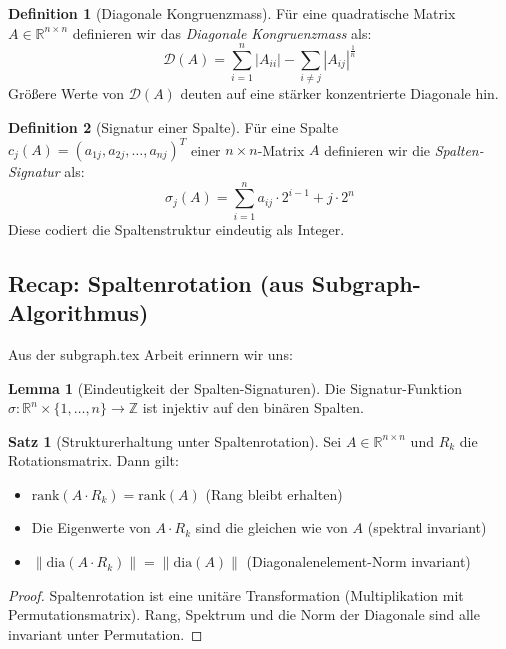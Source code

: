 \documentclass[a4paper,12pt]{article}
\theoremstyle{definition}
\newtheorem{definition}{Definition}
\newtheorem{satz}{Satz}
\newtheorem{lemma}{Lemma}
\begin{document}
\begin{definition}[Diagonale Kongruenzmass]
	Für eine quadratische Matrix $A \in \mathbb{R}^{n \times n}$ definieren wir das \emph{Diagonale Kongruenzmass} als:
	\[
	\mathcal{D}(A) = \sum_{i=1}^{n} |A_{ii}| - \sum_{i \neq j} |A_{ij}|^{\frac{1}{n}}
	\]
	Größere Werte von $\mathcal{D}(A)$ deuten auf eine stärker konzentrierte Diagonale hin.
\end{definition}

\begin{definition}[Signatur einer Spalte]
	Für eine Spalte $c_j(A) = (a_{1j}, a_{2j}, \ldots, a_{nj})^T$ einer $n \times n$-Matrix $A$ definieren wir die \emph{Spalten-Signatur} als:
	\[
	\sigma_j(A) = \sum_{i=1}^{n} a_{ij} \cdot 2^{i-1} + j \cdot 2^n
	\]
	Diese codiert die Spaltenstruktur eindeutig als Integer.
\end{definition}

\subsection{Recap: Spaltenrotation (aus Subgraph-Algorithmus)}

Aus der subgraph.tex Arbeit erinnern wir uns:

\begin{lemma}[Eindeutigkeit der Spalten-Signaturen]
	Die Signatur-Funktion $\sigma: \mathbb{R}^n \times \{1,\ldots,n\} \to \mathbb{Z}$ ist injektiv auf den binären Spalten.
\end{lemma}

\begin{satz}[Strukturerhaltung unter Spaltenrotation]
	Sei $A \in \mathbb{R}^{n \times n}$ und $R_k$ die Rotationsmatrix. Dann gilt:
	\begin{itemize}
		\item $\text{rank}(A \cdot R_k) = \text{rank}(A)$ (Rang bleibt erhalten)
		\item Die Eigenwerte von $A \cdot R_k$ sind die gleichen wie von $A$ (spektral invariant)
		\item $\|\text{dia}(A \cdot R_k)\| = \|\text{dia}(A)\|$ (Diagonalenelement-Norm invariant)
	\end{itemize}
\end{satz}

\begin{proof}
	Spaltenrotation ist eine unitäre Transformation (Multiplikation mit Permutationsmatrix). Rang, Spektrum und die Norm der Diagonale sind alle invariant unter Permutation.
\end{proof}
\end{document}
